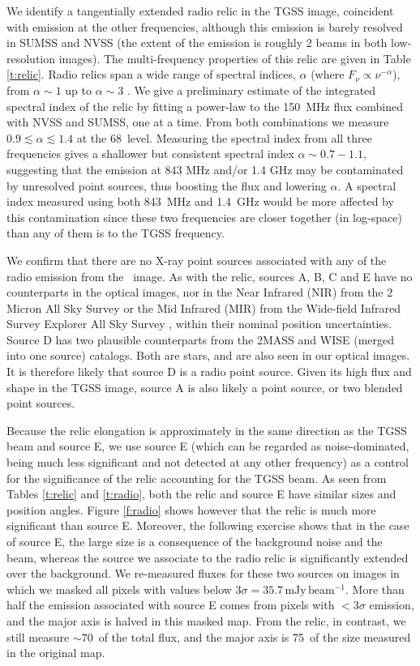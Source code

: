 We identify a tangentially extended radio relic in the TGSS image, coincident with emission at the 
other frequencies, although this emission is barely resolved in SUMSS and NVSS (the extent of the 
emission is roughly 2 beams in both low-resolution images). The multi-frequency properties of this 
relic are given in Table \ref{t:relic}. Radio relics span a wide range of spectral indices, $\alpha$ 
(where $F_\nu\propto\nu^{-\alpha}$), from $\alpha\sim1$ up to $\alpha\sim3$ \citep{feretti12}. We 
give a preliminary estimate of the integrated spectral index of the relic by fitting a power-law to 
the 150~MHz flux combined with NVSS and SUMSS, one at a time. From both combinations we measure 
$0.9\lesssim\alpha\lesssim1.4$ at the 68\percent\ level. Measuring the spectral index from all three 
frequencies gives a shallower but consistent spectral index $\alpha\sim0.7-1.1$, suggesting that the 
emission at 843 MHz and/or 1.4 GHz may be contaminated by unresolved point sources, thus boosting 
the flux and lowering $\alpha$. A spectral index measured using both 843~MHz and 1.4~GHz would be 
more affected by this contamination since these two frequencies are closer together (in log-space) 
than any of them is to the TGSS frequency.

We confirm that there are no X-ray point sources associated with any of the radio emission from 
the \xmm\ image. As with the relic, sources A, B, C and E have no counterparts in the optical 
images, nor in the Near Infrared (NIR) from the 2 Micron All Sky Survey
\citep[2MASS,][]{skrutskie06} or the Mid Infrared (MIR) from the Wide-field Infrared Survey Explorer All Sky Survey \citep[WISE,][]{wright10}, within their nominal position uncertainties. Source D has two plausible counterparts from the 2MASS and WISE (merged into one source) catalogs. Both are stars,
and are also seen in our optical images. It is therefore likely that source D is a radio point
source. Given its high flux and shape in the TGSS image, source A is also likely a point 
source, or two blended point sources.

Because the relic elongation is approximately in the same direction as the TGSS beam and source E, 
we use source E (which can be regarded as noise-dominated, being much less significant and 
not detected at any other frequency) as a control for the significance of the relic accounting for 
the TGSS beam. As seen from Tables \ref{t:relic} and \ref{t:radio}, both the relic and source E 
have similar sizes and position angles. Figure \ref{f:radio} shows however that the relic is much 
more significant than source E. Moreover, the following exercise shows that in the case of source 
E, the large size is a consequence of the background noise and the beam, whereas the source we
associate to the radio relic is significantly extended over the background. We re-measured fluxes 
for these two sources on images in which we masked all pixels with values below 
$3\sigma=35.7\,\mathrm{mJy\,beam^{-1}}$. More than half the emission associated with source E comes 
from pixels with $<3\sigma$ emission, and the major axis is halved in this masked map. From the 
relic, in contrast, we still measure $\sim70$\percent\ of the total flux, and the major axis 
is 75\percent\ of the 
size measured in the original map.

